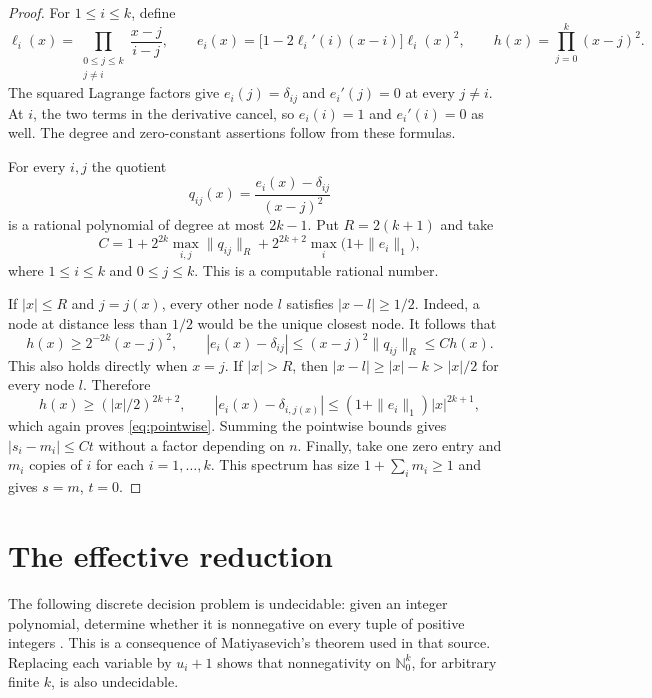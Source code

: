 \documentclass[11pt]{article}
\newcommand{\Nzero}{\mathbb{N}_0}
\begin{document}
\begin{proof}
For $1\leq i\leq k$, define
\begin{equation}\label{eq:interpolants}
 \ell_i(x)=\prod_{\substack{0\leq j\leq k\\j\ne i}}\frac{x-j}{i-j},
 \qquad
 e_i(x)=\bigl[1-2\ell_i'(i)(x-i)\bigr]\ell_i(x)^2,
 \qquad
 h(x)=\prod_{j=0}^k(x-j)^2.
\end{equation}
The squared Lagrange factors give
$e_i(j)=\delta_{ij}$ and $e_i'(j)=0$ at every $j\ne i$. At $i$, the two
terms in the derivative cancel, so $e_i(i)=1$ and $e_i'(i)=0$ as well.
The degree and zero-constant assertions follow from these formulas.

For every $i,j$ the quotient
\[
 q_{ij}(x)=\frac{e_i(x)-\delta_{ij}}{(x-j)^2}
\]
is a rational polynomial of degree at most $2k-1$. Put $R=2(k+1)$ and take
\begin{equation}\label{eq:C}
 C=1+2^{2k}\max_{i,j}\|q_{ij}\|_R
      +2^{2k+2}\max_i\bigl(1+\|e_i\|_1\bigr),
\end{equation}
where $1\leq i\leq k$ and $0\leq j\leq k$. This is a computable rational
number.

If $|x|\leq R$ and $j=j(x)$, every other node $l$ satisfies $|x-l|\geq1/2$.
Indeed, a node at distance less than $1/2$ would be the unique closest node.
It follows that
\[
 h(x)\geq2^{-2k}(x-j)^2,
 \qquad
 |e_i(x)-\delta_{ij}|\leq(x-j)^2\|q_{ij}\|_R\leq C h(x).
\]
This also holds directly when $x=j$. If $|x|>R$, then
$|x-l|\geq |x|-k>|x|/2$ for every node $l$. Therefore
\[
 h(x)\geq (|x|/2)^{2k+2},\qquad
 |e_i(x)-\delta_{i,j(x)}|\leq(1+\|e_i\|_1)|x|^{2k+1},
\]
which again proves \eqref{eq:pointwise}. Summing the pointwise bounds gives
$|s_i-m_i|\leq Ct$ without a factor depending on $n$.
Finally, take one zero entry and $m_i$ copies of $i$ for each $i=1,\ldots,k$.
This spectrum has size $1+\sum_i m_i\geq1$ and gives $s=m$, $t=0$.
\end{proof}

\section{The effective reduction}

The following discrete decision problem is undecidable: given an integer
polynomial, determine whether it is nonnegative on every tuple of positive
integers \cite[Section 5, p.~11 of the arXiv version]{HN}. This is a consequence
of Matiyasevich's theorem used in that source. Replacing each variable by
$u_i+1$ shows that nonnegativity on $\Nzero^k$, for arbitrary finite $k$, is
also undecidable.
\end{document}
